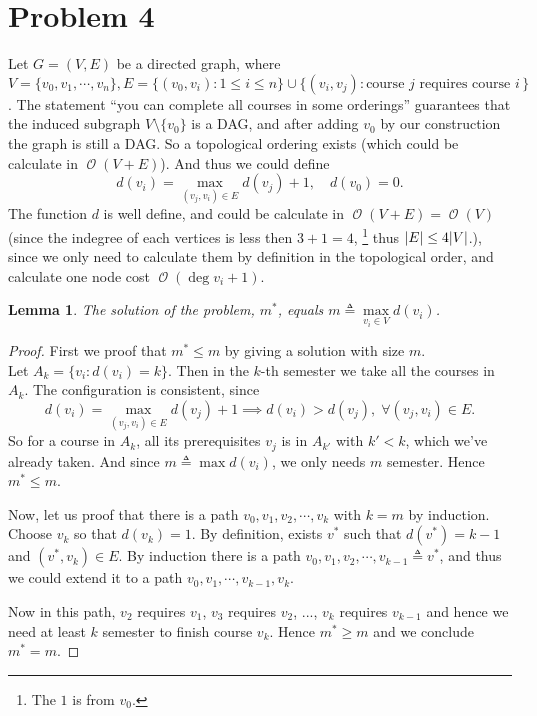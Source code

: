 \documentclass[12pt, a4paper]{article}
\DeclarePairedDelimiter{\abs}{\lvert}{\rvert}
\newcommand{\opord}{\operatorname{\mathcal{O}}}
\newcommand{\ord}[1]{\opord\left(#1\right)}
\newtheorem{lemma}{Lemma}
\begin{document}
\section{Problem 4}
Let $G = (V, E)$ be a directed graph, 
where $V = \{ v_0, v_1, \cdots, v_n \}, E = \{ (v_0, v_i) : 1 \leq i \leq n \}
\cup \{ (v_i, v_j) : \text{course } j \text{ requires course } i \, \}$.
The statement ``you can complete all courses in some orderings'' guarantees
that the induced subgraph $V \setminus \{ v_0 \}$ is a DAG, and after adding $v_0$ by our
construction the graph is still a DAG. So a topological ordering exists (which could be calculate
in $\ord{V + E}$).
And thus we could define
\[ d(v_i) = \max_{(v_j, v_i) \in E} d(v_j) + 1, \quad d(v_0) = 0. \]
The function $d$ is well define, and could be calculate in $\ord{V + E} = \ord{V}$
(since the indegree of each vertices is less then $3 + 1 = 4$, \footnote{The $1$
  is from $v_0$.} thus $\abs{E} \leq 4 \abs{V}$.), since we only need
to calculate them by definition in the topological order, and calculate
one node cost $\ord{\deg v_i + 1}$.

\begin{lemma}
  The solution of the problem, $m^*$, equals $m \triangleq \max\limits_{v_i \in V} d(v_i)$.
\end{lemma}
\begin{proof}
  First we proof that $m^* \leq m$ by giving a solution with size $m$. \\
  Let $A_k = \{ v_i : d(v_i) = k \}$. Then in the $k$-th semester we take all
  the courses in $A_k$. The configuration is consistent, since
  \[ d(v_i) = \max\limits_{(v_j, v_i) \in E} d(v_j) + 1 \implies
  d(v_i) > d(v_j),\; \forall (v_j, v_i) \in E. \]
  So for a course in $A_k$, all its prerequisites $v_j$ is in $A_{k'}$ with $k' < k$,
  which we've already taken. And since $m \triangleq \max d(v_i)$, we only needs $m$
  semester. Hence $m^* \leq m$.

  Now, let us proof that there is a path $v_0, v_1, v_2, \cdots, v_k$ with $k = m$
  by induction. Choose $v_k$ so that $d(v_k) = 1$. By definition, exists $v^*$ such that
  $d(v^*) = k-1$ and $(v^*, v_k) \in E$. By induction there is a path
  $v_0, v_1, v_2, \cdots, v_{k-1} \triangleq v^*$, and thus we could extend it to a path
  $v_0, v_1, \cdots, v_{k-1}, v_k$.

  Now in this path, $v_2$ requires $v_1$, $v_3$ requires $v_2$, ..., $v_k$ requires $v_{k-1}$
  and hence we need at least $k$ semester to finish course $v_k$. Hence $m^* \geq m$ and we
  conclude $m^* = m$.
\end{proof}
\end{document}

